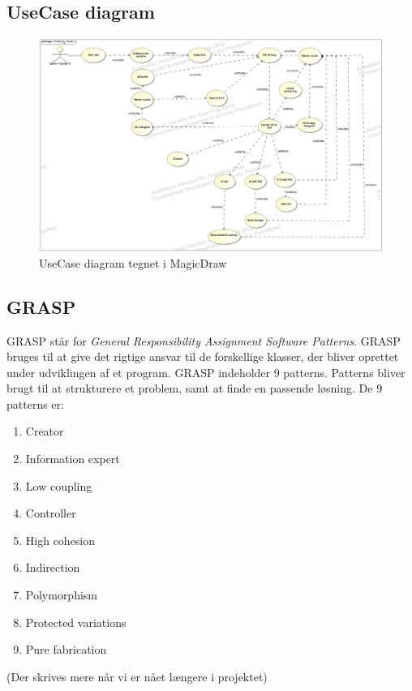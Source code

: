 \subsection{UseCase diagram}
    \begin{figure}[h]
        \advance\leftskip-3cm
        \includegraphics[width=20cm]{fig/UC-cdio3.jpg}
        \caption{UseCase diagram tegnet i MagicDraw}
    \end{figure}

\subsection{GRASP}
    GRASP står for \textit{General Responsibility Assignment Software Patterns}. GRASP bruges til at give det rigtige ansvar til de forskellige klasser, der bliver oprettet under udviklingen af et program. GRASP indeholder 9 patterns. Patterns bliver brugt til at strukturere et problem, samt at finde en passende løsning. De 9 patterns er:
        \begin{enumerate}
            \item Creator
            \item Information expert
            \item Low coupling
            \item Controller
            \item High cohesion
            \item Indirection
            \item Polymorphism
            \item Protected variations
            \item Pure fabrication
        \end{enumerate}
    (Der skrives mere når vi er nået længere i projektet)
